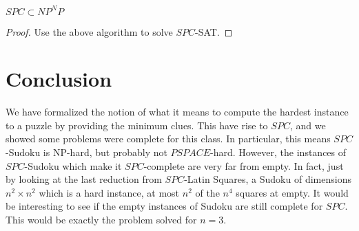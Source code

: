 \documentclass[runningheads,a4paper]{llncs}
\begin{document}
\begin{proposition}
$SPC \subset NP^NP$
\end{proposition}

\begin{proof}
Use the above algorithm to solve $SPC$-SAT. 
\end{proof}

\section{Conclusion}

We have formalized the notion of what it means to compute the hardest instance to a puzzle by providing the minimum clues. This have rise to $SPC$, and we showed some problems were complete for this class. In particular, this means $SPC$-Sudoku is NP-hard, but probably not $PSPACE$-hard. However, the instances of $SPC$-Sudoku which make it $SPC$-complete are very far from empty. In fact, just by looking at the last reduction from $SPC$-Latin Squares, a Sudoku of dimensions $n^2 \times n^2$ which is a hard instance, at most $n^2$ of the $n^4$ squares at empty. It would be interesting to see if the empty instances of Sudoku are still complete for $SPC$. This would be exactly the problem \cite{mcguire2012there} solved for $n = 3$. 



\end{document}
